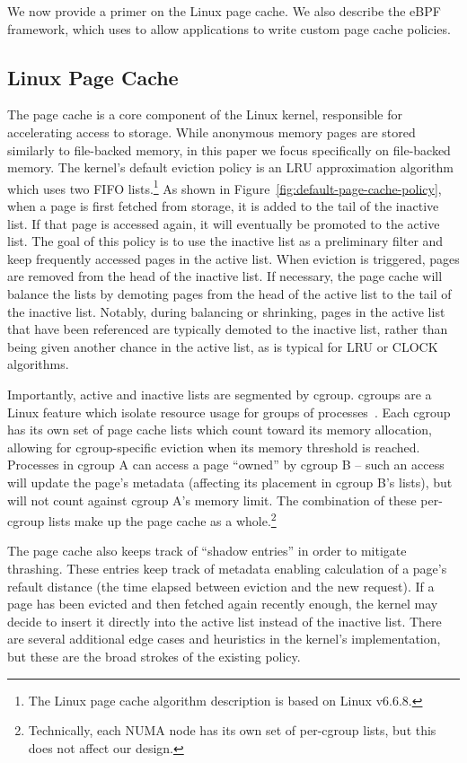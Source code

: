 We now provide a primer on the Linux page cache. We also describe the eBPF framework, which \name uses to allow applications to write custom page cache policies.

\subsection{Linux Page Cache}
\label{sec:primer}

The page cache is a core component of the Linux kernel, responsible for accelerating access to storage. While anonymous memory pages are stored similarly to file-backed memory, in this paper we focus specifically on file-backed memory. %
The kernel's default eviction policy is an LRU approximation algorithm which uses two FIFO lists.\footnote{The Linux page cache algorithm description is based on Linux v6.6.8.} As shown in Figure~\ref{fig:default-page-cache-policy}, when a page is first fetched from storage, it is added to the tail of the inactive list. If that page is accessed again, it will eventually be promoted to the active list. The goal of this policy is to use the inactive list as a preliminary filter and keep frequently accessed pages in the active list. When eviction is triggered, pages are removed from the head of the inactive list. If necessary, the page cache will balance the lists by demoting pages from the head of the active list to the tail of the inactive list. Notably, during balancing or shrinking, pages in the active list that have been referenced are typically demoted to the inactive list, rather than being given another chance in the active list, as is typical for LRU or CLOCK algorithms.

Importantly, active and inactive lists are segmented by cgroup. cgroups are a Linux feature which isolate resource usage for groups of processes~\cite{cgroup-v2}. Each cgroup has its own set of page cache lists which count toward its memory allocation, allowing for cgroup-specific eviction when its memory threshold is reached. Processes in cgroup A can access a page ``owned'' by cgroup B -- such an access will update the page's metadata (affecting its placement in cgroup B's lists), but will not count against cgroup A's memory limit. The combination of these per-cgroup lists make up the page cache as a whole.\footnote{Technically, each NUMA node has its own set of per-cgroup lists, but this does not affect our design.}

The page cache also keeps track of ``shadow entries'' in order to mitigate thrashing. These entries keep track of metadata enabling calculation of a page's refault distance (\ie the time elapsed between eviction and the new request). If a page has been evicted and then fetched again recently enough, the kernel may decide to insert it directly into the active list instead of the inactive list. There are several additional edge cases and heuristics in the kernel's implementation, but these are the broad strokes of the existing policy.

